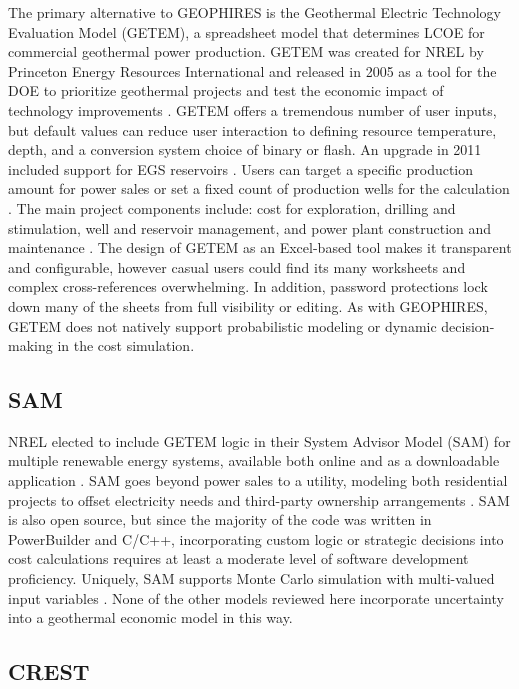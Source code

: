 The primary alternative to GEOPHIRES is the Geothermal Electric Technology Evaluation Model (GETEM), a spreadsheet model that determines LCOE for commercial geothermal power production. GETEM was created for NREL by Princeton Energy Resources International and released in 2005 as a tool for the DOE to prioritize geothermal projects and test the economic impact of technology improvements \citep{entingh_volume_2006}. GETEM offers a tremendous number of user inputs, but default values can reduce user interaction to defining resource temperature, depth, and a conversion system choice of binary or flash. An upgrade in 2011 included support for EGS reservoirs \citep{eere_getem_2012}. Users can target a specific production amount for power sales or set a fixed count of production wells for the calculation \citep{mines_geothermal_2008}. The main project components include: cost for exploration, drilling and stimulation, well and reservoir management, and power plant construction and maintenance \citep{entingh_volume_2006}. The design of GETEM as an Excel-based tool makes it transparent and configurable, however casual users could find its many worksheets and complex cross-references overwhelming. In addition, password protections lock down many of the sheets from full visibility or editing. As with GEOPHIRES, GETEM does not natively support probabilistic modeling or dynamic decision-making in the cost simulation.

\subsection{SAM}\label{ch2:sam}

NREL elected to include GETEM logic in their System Advisor Model (SAM) for multiple renewable energy systems, available both online and as a downloadable application \citep{nrel_system_2021}. SAM goes beyond power sales to a utility, modeling both residential projects to offset electricity needs and third-party ownership arrangements \citep{blair_system_2018}. SAM is also open source, but since the majority of the code was written in PowerBuilder and C/C++, incorporating custom logic or strategic decisions into cost calculations requires at least a moderate level of software development proficiency. Uniquely, SAM supports Monte Carlo simulation with multi-valued input variables \citep{blair_system_2018}. None of the other models reviewed here incorporate uncertainty into a geothermal economic model in this way.

\subsection{CREST}\label{ch2:crest}

